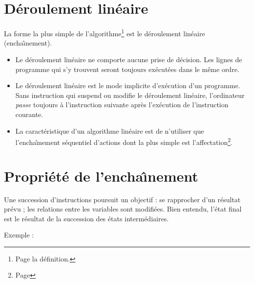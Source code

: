 

\label{Lineaire}

\section*{D\'eroulement lin\'eaire}
   La forme la plus simple de l'algorithme\footnote{Page
   \pageref{Algorithme} la d\'efinition.}
   est le d\'eroulement lin\'eaire (encha\^\i nement).
\begin{itemize}
\item      Le d\'eroulement lin\'eaire ne comporte aucune prise de d\'ecision.
       Les lignes de programme qui s'y trouvent seront toujours ex\'ecut\'ees
       dans le m\^eme ordre.

\item      Le d\'eroulement lin\'eaire est le mode implicite d'ex\'ecution d'un
       programme. 
	   Sans instruction qui
       suspend ou modifie le d\'eroulement lin\'eaire, l'ordinateur {\em passe}
       toujours \`a l'instruction  suivante apr\`es l'ex\'ecution
       de l'instruction courante.

\item La caract\'eristique
       d'un algorithme lin\'eaire est de n'utiliser que l'encha\^\i nement
       s\'equentiel d'actions dont la plus simple est l'affectation\footnote{
	   Page \pageref{Affectation}}.

\end{itemize}
\section*{Propri\'et\'e de l'encha\^\i nement}

Une succession d'instructions poursuit un objectif : se rapprocher
d'un r\'esultat pr\'evu ;  
les relations entre les variables sont modifi\'ees. Bien entendu, l'\'etat final
est le r\'esultat de la succession des \'etats interm\'ediaires.

Exemple :

